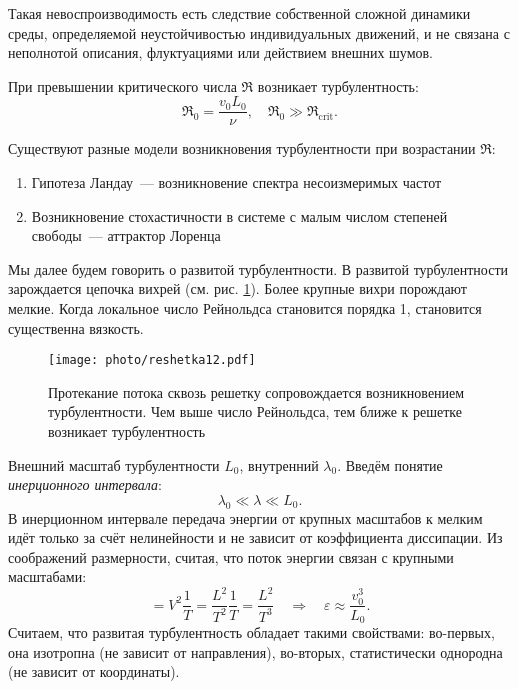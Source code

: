 Такая невоспроизводимость есть следствие собственной сложной динамики среды, определяемой неустойчивостью индивидуальных движений, и не связана с неполнотой описания, флуктуациями или действием внешних шумов.

При превышении критического числа $\Re$ возникает турбулентность:
\begin{equation}
    \Re_0 = \frac{v_0 L_0}{\nu}, \quad \Re_0 \gg \Re_\text{crit}.
\end{equation}

Существуют разные модели возникновения турбулентности при возрастании $\Re$:
\begin{enumerate}
	\item Гипотеза Ландау~--- возникновение спектра несоизмеримых частот
	\item Возникновение стохастичности в системе с малым числом степеней свободы~--- аттрактор Лоренца
\end{enumerate}

Мы далее будем говорить о развитой турбулентности.  В развитой турбулентности зарождается цепочка вихрей (см. рис. \ref{fig:obtekanie}). Более крупные
вихри порождают мелкие. Когда локальное число Рейнольдса становится порядка 1, становится существенна вязкость.

\begin{figure}[H]
	\centering
	\texttt{[image: photo/reshetka12.pdf]}
	\caption{Протекание потока сквозь решетку сопровождается возникновением турбулентности. Чем выше число Рейнольдса, тем ближе к решетке возникает турбулентность}
	\label{fig:obtekanie}
\end{figure}

Внешний масштаб турбулентности $L_0$, внутренний $\lambda_0$.
Введём понятие \textit{инерционного интервала}:
\begin{equation}
    \lambda_0 \ll \lambda \ll L_0.
\end{equation}
В инерционном интервале передача энергии от крупных масштабов к
мелким идёт только за счёт нелинейности и не зависит от коэффициента
диссипации.
Из соображений размерности, считая, что поток энергии связан с крупными масштабами:
\begin{equation}
    [\varepsilon] = V^2 \frac{1}{T} = \frac{L^2}{T^2}\frac{1}{T}=
    \frac{L^2}{T^3}
    \quad\Rightarrow\quad
    \varepsilon \approx \frac{v_0^3}{L_0}.
\end{equation}
Считаем, что развитая турбулентность обладает такими свойствами:
во-первых, она изотропна (не зависит от направления), во-вторых,
статистически однородна (не зависит от координаты).

